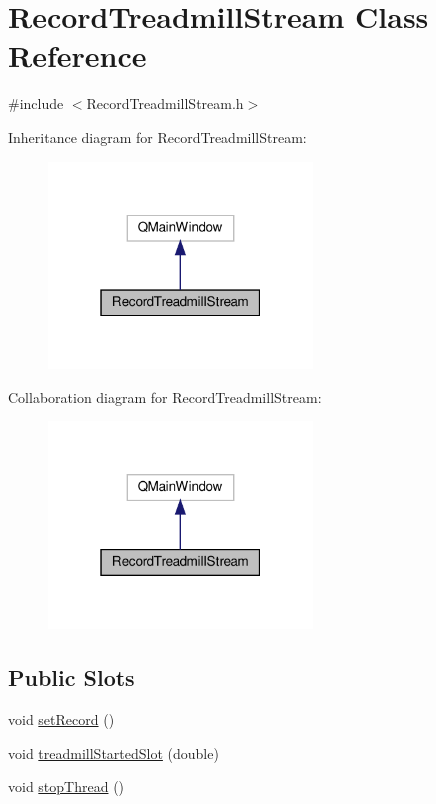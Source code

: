 \hypertarget{class_record_treadmill_stream}{}\section{Record\+Treadmill\+Stream Class Reference}
\label{class_record_treadmill_stream}


{\ttfamily \#include $<$Record\+Treadmill\+Stream.\+h$>$}



Inheritance diagram for Record\+Treadmill\+Stream\+:
\nopagebreak
\begin{figure}[H]
\begin{center}
\leavevmode
\includegraphics[width=199pt]{class_record_treadmill_stream__inherit__graph}
\end{center}
\end{figure}


Collaboration diagram for Record\+Treadmill\+Stream\+:
\nopagebreak
\begin{figure}[H]
\begin{center}
\leavevmode
\includegraphics[width=199pt]{class_record_treadmill_stream__coll__graph}
\end{center}
\end{figure}
\subsection*{Public Slots}
\begin{DoxyCompactItemize}
\item 
void \hyperlink{class_record_treadmill_stream_acc6674f00b212bb11e642f9d54a2edb4}{set\+Record} ()
\item 
void \hyperlink{class_record_treadmill_stream_ac35d01f4cc74269eaecd732d60284e89}{treadmill\+Started\+Slot} (double)
\item 
void \hyperlink{class_record_treadmill_stream_a4ab55dd8bf6498780d3fc92a6ae545f1}{stop\+Thread} ()
\end{DoxyCompactItemize}
